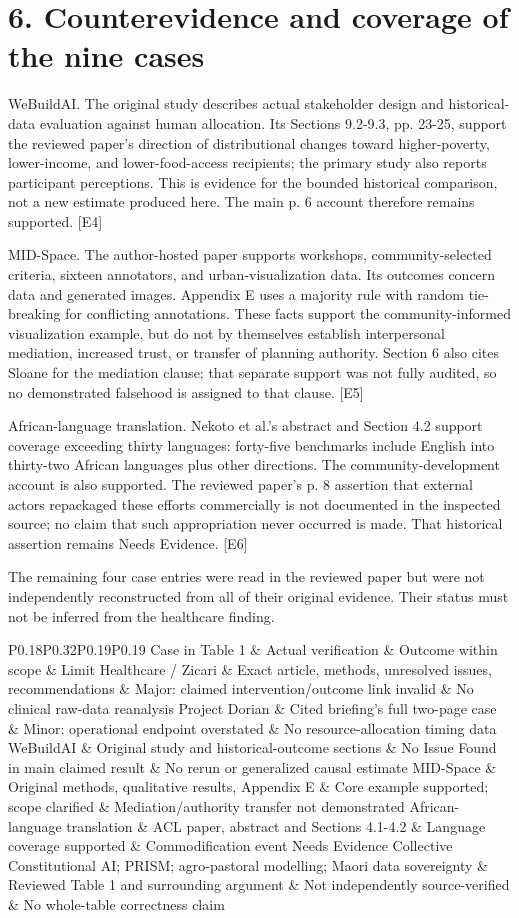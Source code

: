 \documentclass[10pt]{article}
\begin{document}
\section*{6. Counterevidence and coverage of the nine cases}
WeBuildAI. The original study describes actual stakeholder design and historical-data evaluation against human allocation. Its Sections 9.2-9.3, pp. 23-25, support the reviewed paper’s direction of distributional changes toward higher-poverty, lower-income, and lower-food-access recipients; the primary study also reports participant perceptions. This is evidence for the bounded historical comparison, not a new estimate produced here. The main p. 6 account therefore remains supported. [E4]\par
MID-Space. The author-hosted paper supports workshops, community-selected criteria, sixteen annotators, and urban-visualization data. Its outcomes concern data and generated images. Appendix E uses a majority rule with random tie-breaking for conflicting annotations. These facts support the community-informed visualization example, but do not by themselves establish interpersonal mediation, increased trust, or transfer of planning authority. Section 6 also cites Sloane for the mediation clause; that separate support was not fully audited, so no demonstrated falsehood is assigned to that clause. [E5]\par
African-language translation. Nekoto et al.’s abstract and Section 4.2 support coverage exceeding thirty languages: forty-five benchmarks include English into thirty-two African languages plus other directions. The community-development account is also supported. The reviewed paper’s p. 8 assertion that external actors repackaged these efforts commercially is not documented in the inspected source; no claim that such appropriation never occurred is made. That historical assertion remains Needs Evidence. [E6]\par
The remaining four case entries were read in the reviewed paper but were not independently reconstructed from all of their original evidence. Their status must not be inferred from the healthcare finding.\par
P0.18P0.32P0.19P0.19 Case in Table 1 \& Actual verification \& Outcome within scope \& Limit
Healthcare / Zicari \& Exact article, methods, unresolved issues, recommendations \& Major: claimed intervention/outcome link invalid \& No clinical raw-data reanalysis
Project Dorian \& Cited briefing’s full two-page case \& Minor: operational endpoint overstated \& No resource-allocation timing data
WeBuildAI \& Original study and historical-outcome sections \& No Issue Found in main claimed result \& No rerun or generalized causal estimate
MID-Space \& Original methods, qualitative results, Appendix E \& Core example supported; scope clarified \& Mediation/authority transfer not demonstrated
African-language translation \& ACL paper, abstract and Sections 4.1-4.2 \& Language coverage supported \& Commodification event Needs Evidence
Collective Constitutional AI; PRISM; agro-pastoral modelling; Maori data sovereignty \& Reviewed Table 1 and surrounding argument \& Not independently source-verified \& No whole-table correctness claim\par
\end{document}
